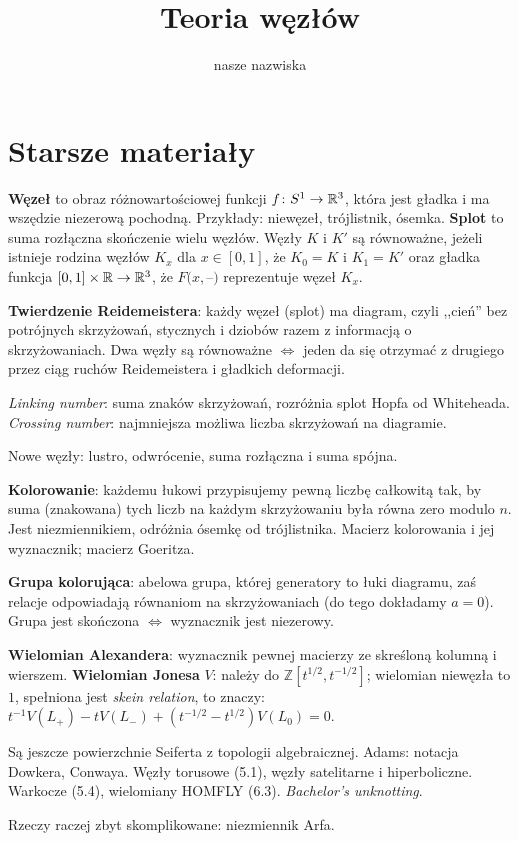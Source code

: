 \documentclass[a4paper, fleqn]{extarticle}
\title{Teoria węzłów}
\author{nasze nazwiska}
\numberwithin{dummy}{section}
\begin{document}
\maketitle
\tableofcontents

%

%


\newpage

\raggedright

\section*{Starsze materiały}

\textbf{Węzeł} to obraz różnowartościowej funkcji $f \colon S^1 \to \mathbb R^3$, która jest gładka i ma wszędzie niezerową pochodną. Przykłady: niewęzeł, trójlistnik, ósemka.
\textbf{Splot} to suma rozłączna skończenie wielu węzłów.
Węzły $K$ i $K'$ są równoważne, jeżeli istnieje rodzina węzłów $K_x$ dla $x \in [0,1]$, że $K_0 = K$ i $K_1 = K'$ oraz gładka funkcja $[0,1] \times \mathbb R \to \mathbb R^3$, że $F(x,$--$)$ reprezentuje węzeł $K_x$.

\textbf{Twierdzenie Reidemeistera}: każdy węzeł (splot) ma diagram, czyli ,,cień'' bez potrójnych skrzyżowań, stycznych i dziobów razem z informacją o skrzyżowaniach.
Dwa węzły są równoważne $\iff$ jeden da się otrzymać z drugiego przez ciąg ruchów Reidemeistera i gładkich deformacji.

\emph{Linking number}: suma znaków skrzyżowań, rozróżnia splot Hopfa od Whiteheada.
\emph{Crossing number}: najmniejsza możliwa liczba skrzyżowań na diagramie.

Nowe węzły: lustro, odwrócenie, suma rozłączna i suma spójna.

\textbf{Kolorowanie}: każdemu łukowi przypisujemy pewną liczbę całkowitą tak, by suma (znakowana) tych liczb na każdym skrzyżowaniu była równa zero modulo $n$.
Jest niezmiennikiem, odróżnia ósemkę od trójlistnika.
Macierz kolorowania i jej wyznacznik; macierz Goeritza.

\textbf{Grupa kolorująca}: abelowa grupa, której generatory to łuki diagramu, zaś relacje odpowiadają równaniom na skrzyżowaniach (do tego dokładamy $a = 0$).
Grupa jest skończona $\iff$ wyznacznik jest niezerowy.

\textbf{Wielomian Alexandera}: wyznacznik pewnej macierzy ze skreśloną kolumną i wierszem.
\textbf{Wielomian Jonesa} $V$: należy do $\mathbb Z[t^{1/2}, t^{-1/2}]$; wielomian niewęzła to $1$, spełniona jest \emph{skein relation}, to znaczy: $t^{-1}V(L_+)-tV(L_-)+(t^{-1/2}-t^{1/2})V(L_0)=0$.

Są jeszcze powierzchnie Seiferta z topologii algebraicznej.
Adams: notacja Dowkera, Conwaya. Węzły torusowe (5.1), węzły satelitarne i hiperboliczne.
Warkocze (5.4), wielomiany HOMFLY (6.3).
\emph{Bachelor's unknotting}.

Rzeczy raczej zbyt skomplikowane: niezmiennik Arfa.
\end{document}
